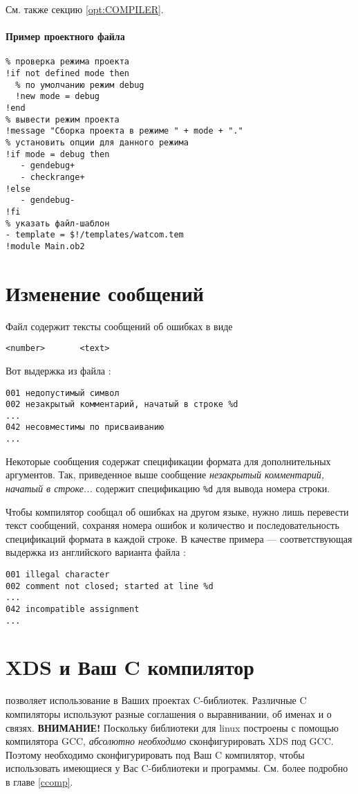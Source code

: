 См. также секцию \ref{opt:COMPILER}.

\paragraph{Пример проектного файла}
\begin{verbatim}
% проверка режима проекта
!if not defined mode then
  % по умолчанию режим debug 
  !new mode = debug
!end
% вывести режим проекта
!message "Сборка проекта в режиме " + mode + "."
% установить опции для данного режима
!if mode = debug then
   - gendebug+
   - checkrange+
!else
   - gendebug-
!fi
% указать файл-шаблон
- template = $!/templates/watcom.tem
!module Main.ob2
\end{verbatim}

\section{Изменение сообщений \XDS{}}\label{xc:msg}

Файл {\tt \msg} содержит тексты сообщений об ошибках в виде

\verb'<number>       <text>'

Вот выдержка из файла \msg{}:
\begin{verbatim}
001 недопустимый символ
002 незакрытый комментарий, начатый в строке %d
...
042 несовместимы по присваиванию
...
\end{verbatim}

Некоторые сообщения содержат спецификации формата для дополнительных
аргументов. Так, приведенное выше сообщение
{\em незакрытый комментарий, начатый в строке...} содержит спецификацию 
\verb|%d| для вывода номера строки.

Чтобы компилятор сообщал об ошибках на другом языке, нужно лишь перевести
текст сообщений, сохраняя номера ошибок и количество и последовательность
спецификаций формата в каждой строке. 
В качестве примера --- соответствующая выдержка из английского варианта
файла \msg{}:
\begin{verbatim}
001 illegal character
002 comment not closed; started at line %d
...
042 incompatible assignment
...
\end{verbatim}

\section{XDS и Ваш C компилятор}\label{config:C}

\ifgencode %
  \xds{} позволяет использование в Ваших проектах C-библиотек.
  Различные C компиляторы используют разные соглашения о
  выравнивании, об именах и о связях.
  \iflinux
    {\bf ВНИМАНИЕ!} Поскольку библиотеки \xds{} для linux 
    построены с помощью компилятора GCC,
    {\em абсолютно необходимо} сконфигурировать XDS под GCC.
  \else %
    Поэтому необходимо сконфигурировать \xds{} под Ваш C компилятор,
    чтобы использовать имеющиеся у Вас C-библиотеки и программы.
  \fi  %
  См. более подробно в главе \ref{ccomp}.
\fi  %

